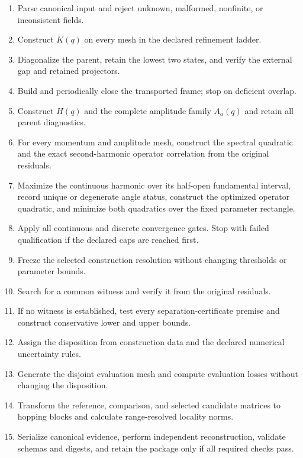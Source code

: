 \documentclass[11pt]{article}
\begin{document}
\begin{enumerate}[label=\arabic*.]
  \item Parse canonical input and reject unknown, malformed, nonfinite, or inconsistent
        fields.
  \item Construct $K(q)$ on every mesh in the declared refinement ladder.
  \item Diagonalize the parent, retain the lowest two states, and verify the external
        gap and retained projectors.
  \item Build and periodically close the transported frame; stop on deficient overlap.
  \item Construct $H(q)$ and the complete amplitude family $A_a(q)$ and retain all
        parent diagnostics.
  \item For every momentum and amplitude mesh, construct the spectral quadratic and the
        exact second-harmonic operator correlation from the original residuals.
  \item Maximize the continuous harmonic over its half-open fundamental interval,
        record unique or degenerate angle status, construct the optimized operator
        quadratic, and minimize both quadratics over the fixed parameter rectangle.
  \item Apply all continuous and discrete convergence gates. Stop with failed
        qualification if the declared caps are reached first.
  \item Freeze the selected construction resolution without changing thresholds or
        parameter bounds.
  \item Search for a common witness and verify it from the original residuals.
  \item If no witness is established, test every separation-certificate premise and
        construct conservative lower and upper bounds.
  \item Assign the disposition from construction data and the declared numerical
        uncertainty rules.
  \item Generate the disjoint evaluation mesh and compute evaluation losses without
        changing the disposition.
  \item Transform the reference, comparison, and selected candidate matrices to hopping
        blocks and calculate range-resolved locality norms.
  \item Serialize canonical evidence, perform independent reconstruction, validate
        schemas and digests, and retain the package only if all required checks pass.
\end{enumerate}
\end{document}
